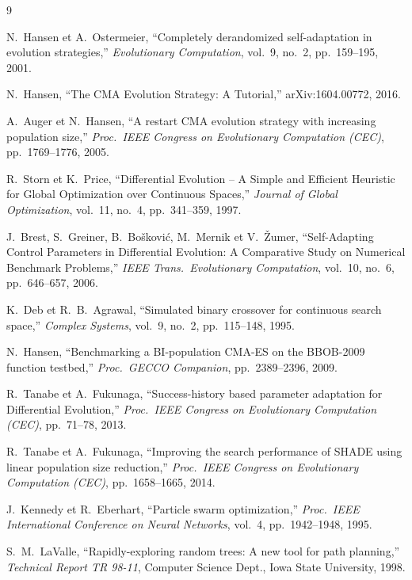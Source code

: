 \begin{thebibliography}{9}

N.~Hansen et A.~Ostermeier,
``Completely derandomized self-adaptation in evolution strategies,''
\emph{Evolutionary Computation}, vol.~9, no.~2, pp.~159--195, 2001.

N.~Hansen,
``The CMA Evolution Strategy: A Tutorial,''
arXiv:1604.00772, 2016.

A.~Auger et N.~Hansen,
``A restart CMA evolution strategy with increasing population size,''
\emph{Proc.\ IEEE Congress on Evolutionary Computation (CEC)}, pp.~1769--1776,
2005.

R.~Storn et K.~Price,
``Differential Evolution -- A Simple and Efficient Heuristic for Global
Optimization over Continuous Spaces,''
\emph{Journal of Global Optimization}, vol.~11, no.~4, pp.~341--359, 1997.

J.~Brest, S.~Greiner, B.~Bošković, M.~Mernik et V.~Žumer,
``Self-Adapting Control Parameters in Differential Evolution: A Comparative
Study on Numerical Benchmark Problems,''
\emph{IEEE Trans.\ Evolutionary Computation}, vol.~10, no.~6, pp.~646--657,
2006.

K.~Deb et R.~B.~Agrawal,
``Simulated binary crossover for continuous search space,''
\emph{Complex Systems}, vol.~9, no.~2, pp.~115--148, 1995.

N.~Hansen,
``Benchmarking a BI-population CMA-ES on the BBOB-2009 function testbed,''
\emph{Proc.\ GECCO Companion}, pp.~2389--2396, 2009.

R.~Tanabe et A.~Fukunaga,
``Success-history based parameter adaptation for Differential Evolution,''
\emph{Proc.\ IEEE Congress on Evolutionary Computation (CEC)}, pp.~71--78,
2013.

R.~Tanabe et A.~Fukunaga,
``Improving the search performance of SHADE using linear population size
reduction,''
\emph{Proc.\ IEEE Congress on Evolutionary Computation (CEC)}, pp.~1658--1665,
2014.

J.~Kennedy et R.~Eberhart,
``Particle swarm optimization,''
\emph{Proc.\ IEEE International Conference on Neural Networks}, vol.~4,
pp.~1942--1948, 1995.

S.~M.~LaValle,
``Rapidly-exploring random trees: A new tool for path planning,''
\emph{Technical Report TR 98-11}, Computer Science Dept., Iowa State
University, 1998.


\end{thebibliography}
